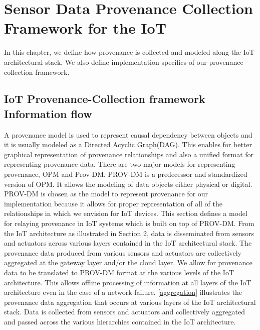 
\chapter{Sensor Data Provenance Collection Framework for the IoT}

In this chapter, we define how provenance is collected and modeled along the IoT architectural stack. We also define implementation specifics of our provenance collection framework. 

\section{IoT Provenance-Collection framework Information flow}
%

A provenance model is used to represent causal dependency between objects and it is usually modeled as a Directed Acyclic Graph(DAG). This enables for better graphical representation of provenance relationships and also a unified format for representing provenance data. There are two major models for representing provenance, OPM and Prov-DM. PROV-DM is a predecessor and standardized version of OPM. It allows the modeling of data objects either physical or digital. PROV-DM is chosen as the model to represent provenance for our implementation because it allows for proper representation of all of the relationships in which we envision for IoT devices. This section defines a model for relaying provenance in IoT systems which is built on top of PROV-DM. 
From the IoT architecture as illustrated in Section 2, data is disseminated from sensors and actuators across various layers contained in the IoT architectural stack. The provenance data produced from various sensors and actuators are collectively aggregated at the gateway layer and/or the cloud layer. We allow for provenance data to be translated to PROV-DM format at the various levels of the IoT architecture. This allows offline processing of information at all layers of the IoT architecture even in the case of a network failure. 
 \ref{aggregation} illustrates the provenance data aggregation that occurs at various layers of the IoT architectural stack. Data is collected from sensors and actuators and collectively aggregated and passed across the various hierarchies contained in the IoT architecture. 


